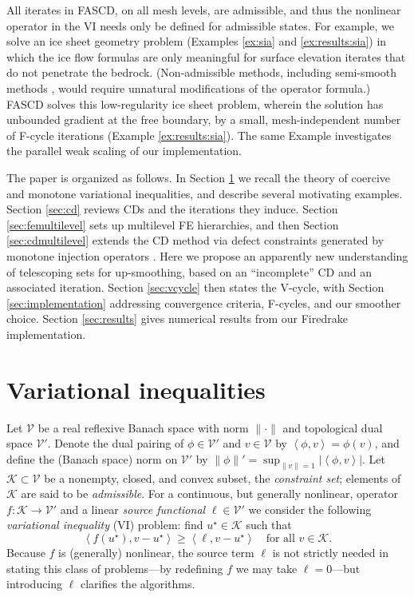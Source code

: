 \documentclass[review,hidelinks,onefignum,onetabnum]{siamart220329}
\newcommand{\cK}{\mathcal{K}}
\newcommand{\cV}{\mathcal{V}}
\newcommand{\ip}[2]{\left<#1,#2\right>}
\begin{document}
All iterates in FASCD, on all mesh levels, are admissible, and thus the nonlinear operator in the VI needs only be defined for admissible states.  For example, we solve an ice sheet geometry problem (Examples \ref{ex:sia} and \ref{ex:results:sia}) in which the ice flow formulas are only meaningful for surface elevation iterates that do not penetrate the bedrock.  (Non-admissible methods, including semi-smooth methods \cite{BensonMunson2006}, would require unnatural modifications of the operator formula.)  FASCD solves this low-regularity ice sheet problem, wherein the solution has unbounded gradient at the free boundary, by a small, mesh-independent number of F-cycle iterations (Example \ref{ex:results:sia}). The same Example investigates the parallel weak scaling \cite{Bueler2021} of our implementation.

The paper is organized as follows.  In Section \ref{sec:vi} we recall the theory of coercive and monotone variational inequalities, and describe several motivating examples.  Section \ref{sec:cd} reviews CDs and the iterations they induce.  Section \ref{sec:femultilevel} sets up multilevel FE hierarchies, and then Section \ref{sec:cdmultilevel} extends the CD method via defect constraints generated by monotone injection operators \cite{GraeserKornhuber2009}.  Here we propose an apparently new understanding of telescoping sets for up-smoothing, based on an ``incomplete'' CD and an associated iteration.  Section \ref{sec:vcycle} then states the V-cycle, with Section \ref{sec:implementation} addressing convergence criteria, F-cycles, and our smoother choice.  Section \ref{sec:results} gives numerical results from our Firedrake \cite{Rathgeberetal2016} implementation.


\section{Variational inequalities} \label{sec:vi}

Let $\cV$ be a real reflexive Banach space with norm $\|\cdot\|$ and topological dual space $\cV'$.  Denote the dual pairing of $\phi \in \cV'$ and $v\in\cV$ by $\ip{\phi}{v} = \phi(v)$, and define the (Banach space) norm on $\cV'$ by $\|\phi\|' = \sup_{\|v\|=1} |\!\ip{\phi}{v}\!|$.  Let $\cK \subset \cV$ be a nonempty, closed, and convex subset, the \emph{constraint set}; elements of $\cK$ are said to be \emph{admissible}.  For a continuous, but generally nonlinear, operator $f:\cK \to \cV'$ and a linear \emph{source functional} $\ell\in \cV'$ we consider the following \emph{variational inequality} (VI) problem: find $u^\star\in \cK$ such that
\begin{equation}
\ip{f(u^\star)}{v-u^\star} \ge \ip{\ell}{v-u^\star} \quad \text{for all } v\in \cK. \label{eq:vi}
\end{equation}
Because $f$ is (generally) nonlinear, the source term $\ell$ is not strictly needed in stating this class of problems---by redefining $f$ we may take $\ell=0$---but introducing $\ell$ clarifies the algorithms.
\end{document}

